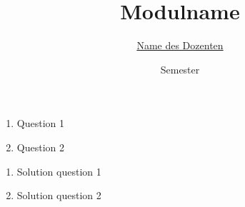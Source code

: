 


\title{Modulname}
\date{Semester}
\author{\href{mailto:name@adress}{Name des Dozenten}}


\newcommand{\sheetnumber}{1}
\newcommand{\publishdate}{09.10.2019}
\newcommand{\handindate}{16.10.2019, 10:00 pm}
\setcounter{question}{0}




\begin{aufgabe}[subtitle={nice excercise}]
  \begin{enumerate}
    \item Question 1
    \item Question 2
  \end{enumerate}
\end{aufgabe}

\begin{loesung}
  \begin{enumerate}
    \item Solution question 1
    \item Solution question 2
  \end{enumerate}
\end{loesung}


